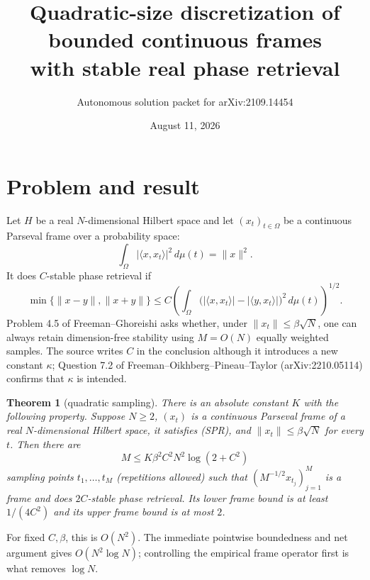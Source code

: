 \documentclass[11pt]{article}
\title{Quadratic-size discretization of bounded continuous frames\\
with stable real phase retrieval}
\author{Autonomous solution packet for arXiv:2109.14454}
\date{August 11, 2026}
\newtheorem{theorem}{Theorem}
\newcommand{\ip}[2]{\langle #1,#2\rangle}
\begin{document}
\maketitle

\begin{center}
\end{center}

\section{Problem and result}

Let $H$ be a real $N$-dimensional Hilbert space and let
$(x_t)_{t\in\Omega}$ be a continuous Parseval frame over a probability
space:
\[
 \int_\Omega |\ip{x}{x_t}|^2\,d\mu(t)=\|x\|^2.
\]
It does $C$-stable phase retrieval if
\[
 \min\{\|x-y\|,\|x+y\|\}
 \le C\left(\int_\Omega
 \bigl(|\ip{x}{x_t}|-|\ip{y}{x_t}|\bigr)^2\,d\mu(t)\right)^{1/2}.
                                                               \tag{SPR}
\]
Problem 4.5 of Freeman--Ghoreishi asks whether, under
$\|x_t\|\le\beta\sqrt N$, one can always retain dimension-free stability
using $M=O(N)$ equally weighted samples.  The source writes $C$ in the
conclusion although it introduces a new constant $\kappa$; Question 7.2 of
Freeman--Oikhberg--Pineau--Taylor (arXiv:2210.05114) confirms that $\kappa$
is intended.

\begin{theorem}[quadratic sampling]\label{thm:main}
There is an absolute constant $K$ with the following property.  Suppose
$N\ge2$, $(x_t)$ is a continuous Parseval frame of a real $N$-dimensional
Hilbert space, it satisfies\/ {\rm(SPR)}, and
$\|x_t\|\le\beta\sqrt N$ for every $t$.  Then there are
\[
 M\le K\beta^2C^2N^2\log(2+C^2)
\]
sampling points $t_1,\ldots,t_M$ (repetitions allowed) such that
$(M^{-1/2}x_{t_j})_{j=1}^M$ is a frame and does $2C$-stable phase
retrieval.  Its lower frame bound is at least $1/(4C^2)$ and its upper
frame bound is at most $2$.
\end{theorem}

For fixed $C,\beta$, this is $O(N^2)$.  The immediate pointwise boundedness
and net argument gives $O(N^2\log N)$; controlling the empirical frame
operator first is what removes $\log N$.
\end{document}
